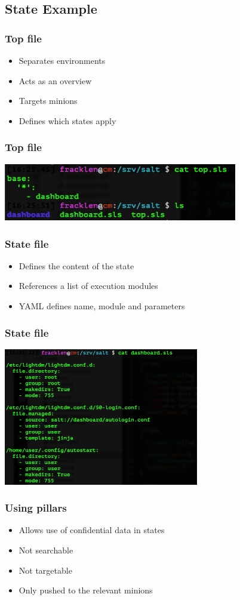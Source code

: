 \subsection{State Example}
\frame
{
  \frametitle{Top file}
  \begin{itemize}
  \item<1-> Separates environments
  \item<2-> Acts as an overview
  \item<3-> Targets minions
  \item<4-> Defines which states apply
  \end{itemize}
}

\frame
{
  \frametitle{Top file}

  \begin{center}%
    \includegraphics[height=2.5cm]{images/salt_top.png}
  \end{center}%
}

\frame
{
  \frametitle{State file}
  \begin{itemize}
  \item<1-> Defines the content of the state
  \item<2-> References a list of execution modules
  \item<3-> YAML defines name, module and parameters
  \end{itemize}
}

\frame
{
  \frametitle{State file}

  \begin{center}%
    \includegraphics[height=6cm]{images/salt_state.png}
  \end{center}%
}

\frame
{
  \frametitle{Using pillars}
  \begin{itemize}
  \item<1-> Allows use of confidential data in states
  \item<2-> Not searchable
  \item<3-> Not targetable
  \item<4-> Only pushed to the relevant minions
  \end{itemize}
}

